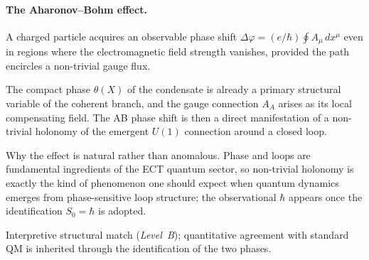 \documentclass[11pt,a4paper]{article}
\begin{document}
\paragraph{The Aharonov--Bohm effect.}
\begin{description}[leftmargin=2.8cm, style=nextline]
\item[Standard QM.] A charged particle acquires an observable phase shift $\Delta\varphi = (e/\hbar)\oint A_\mu\,dx^\mu$ even in regions where the electromagnetic field strength vanishes, provided the path encircles a non-trivial gauge flux.
\item[ECT (physical picture).] The compact phase $\theta(X)$ of the condensate is already a primary structural variable of the coherent branch, and the gauge connection $A_A$ arises as its local compensating field.  The AB phase shift is then a direct manifestation of a non-trivial holonomy of the emergent $U(1)$ connection around a closed loop.
\item[What this explains.] Why the effect is natural rather than anomalous.  Phase and loops are fundamental ingredients of the ECT quantum sector, so non-trivial holonomy is exactly the kind of phenomenon one should expect when quantum dynamics emerges from phase-sensitive loop structure; the observational $\hbar$ appears once the identification $S_0=\hbar$ is adopted.
\item[Status.] Interpretive structural match (\emph{Level~B}); quantitative agreement with standard QM is inherited through the identification of the two phases.
\end{description}
\end{document}
